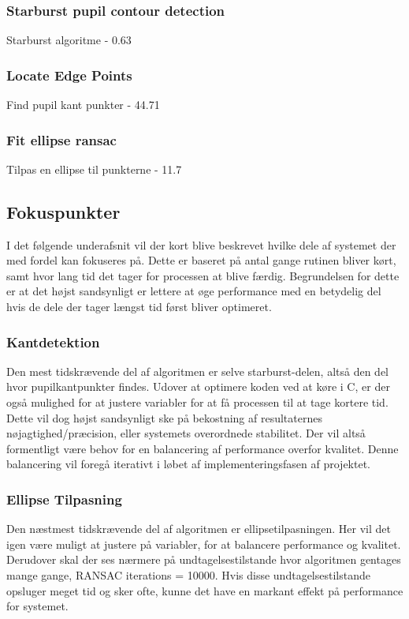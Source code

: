 \documentclass[rapport.tex]{subfiles}
\begin{document}
	\subsubsection{Starburst pupil contour detection}
	
	Starburst algoritme - 0.63%
	
	\subsubsection{Locate Edge Points}
	
	Find pupil kant punkter - 44.71%
	
	\subsubsection{Fit ellipse ransac}
	
	Tilpas en ellipse til punkterne - 11.7%
	
	\subsection{Fokuspunkter}
	I det følgende underafsnit vil der kort blive beskrevet hvilke dele af systemet der med fordel kan fokuseres på. Dette er baseret på antal gange rutinen bliver kørt, samt hvor lang tid det tager for processen at blive færdig. Begrundelsen for dette er at det højst sandsynligt er lettere at øge performance med en betydelig del hvis de dele der tager længst tid først bliver optimeret.
	
	\subsubsection{Kantdetektion}
	Den mest tidskrævende del af algoritmen er selve starburst-delen, altså den del hvor pupilkantpunkter findes. Udover at optimere koden ved at køre i C, er der også mulighed for at justere variabler for at få processen til at tage kortere tid. Dette vil dog højst sandsynligt ske på bekostning af resultaternes nøjagtighed/præcision, eller systemets overordnede stabilitet. Der vil altså formentligt være behov for en balancering af performance overfor kvalitet. Denne balancering vil foregå iterativt i løbet af implementeringsfasen af projektet.
	
	\subsubsection{Ellipse Tilpasning}
	Den næstmest tidskrævende del af algoritmen er ellipsetilpasningen. Her vil det igen være muligt at justere på variabler, for at balancere performance og kvalitet. Derudover skal der ses nærmere på undtagelsestilstande hvor algoritmen gentages mange gange, RANSAC iterations = 10000. Hvis disse undtagelsestilstande opsluger meget tid og sker ofte, kunne det have en markant effekt på performance for systemet.
	
\end{document}
